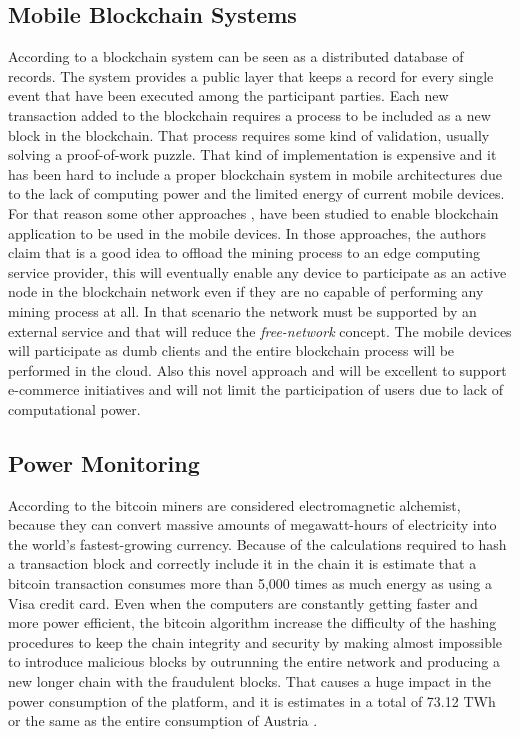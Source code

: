 \documentclass[journal]{IEEEtran}
\begin{document}
\subsection{Mobile Blockchain Systems}
According to \cite{crosby2016} a blockchain system can be seen as a distributed database of records. 
The system provides a public layer that keeps a record for every single event that have been executed among the participant parties.
Each new transaction added to the blockchain requires a process to be included as a new block in the blockchain. That process requires some kind of validation, usually
solving a proof-of-work puzzle.
That kind of implementation is expensive and it has been hard to include a proper blockchain system in mobile architectures
due to the lack of computing power and the limited energy of current mobile devices. For that reason some other approaches \cite{xiongfengniyatowanghan2018}, \cite{ZehuiXiong} have been studied to enable
blockchain application to be used in the mobile devices. 
In those approaches, the authors claim that is a good idea to offload the mining process to an edge computing service provider, this will eventually enable any 
device to participate as an active node in the blockchain network even if they are no capable of performing any mining process at all. 
In that scenario the network must be supported by an external service and that will reduce the \emph{free-network} concept. The mobile devices will participate  as dumb clients and the entire
blockchain process will be performed in the cloud.
Also this novel approach and will be excellent to support e-commerce initiatives and will not limit the participation of
users due to lack of computational power.

\subsection{Power Monitoring}
According to \cite{fairley2017} the bitcoin miners are considered electromagnetic alchemist, because they can convert massive amounts of megawatt-hours of electricity into the world's fastest-growing currency.
Because of the calculations required to hash a transaction block and correctly include it in the chain it is estimate that a bitcoin transaction consumes more than 5,000 times as much energy as using a Visa credit card.
Even when the computers are constantly getting faster and more power efficient, the bitcoin algorithm increase the difficulty of the hashing procedures to keep the chain integrity and security by making almost impossible to introduce malicious blocks by outrunning the entire network and producing a new longer chain with the fraudulent blocks. That causes a huge impact in the power consumption of the platform, and it is estimates in a total of 73.12 TWh or the same as the entire consumption of Austria \cite{digiconomist}.
\end{document}
